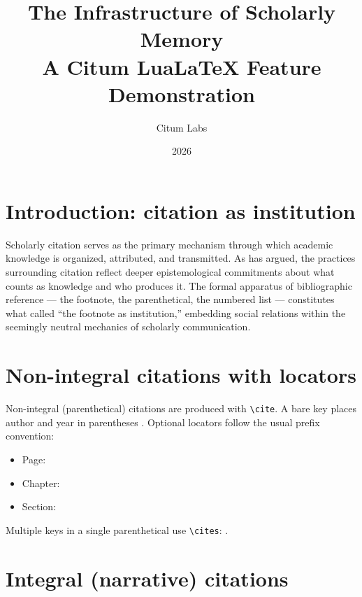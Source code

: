 \documentclass{article}
\title{The Infrastructure of Scholarly Memory\\
       {\large A Citum Lua\LaTeX{} Feature Demonstration}}
\author{Citum Labs}
\date{2026}
\begin{document}
\maketitle

\section{Introduction: citation as institution}

Scholarly citation serves as the primary mechanism through which academic
knowledge is organized, attributed, and transmitted.
As \textcite{chen2017} has argued, the practices surrounding citation
reflect deeper epistemological commitments about what counts as knowledge
and who produces it.
The formal apparatus of bibliographic reference --- the footnote, the
parenthetical, the numbered list --- constitutes what \textcite{webb1968}
called ``the footnote as institution,'' embedding social relations within
the seemingly neutral mechanics of scholarly communication.

\section{Non-integral citations with locators}

Non-integral (parenthetical) citations are produced with \verb|\cite|.
A bare key places author and year in parentheses \cite{chen2017}.
Optional locators follow the usual prefix convention:

\begin{itemize}
  \item Page: \cite[p.~42]{chen2017}
  \item Chapter: \cite[ch.~3]{webb1968}
  \item Section: \cite[sect.~2]{okafor2024}
\end{itemize}

Multiple keys in a single parenthetical use \verb|\cites|:
\cites{chen2017, okafor2024}.

\section{Integral (narrative) citations}
\end{document}
